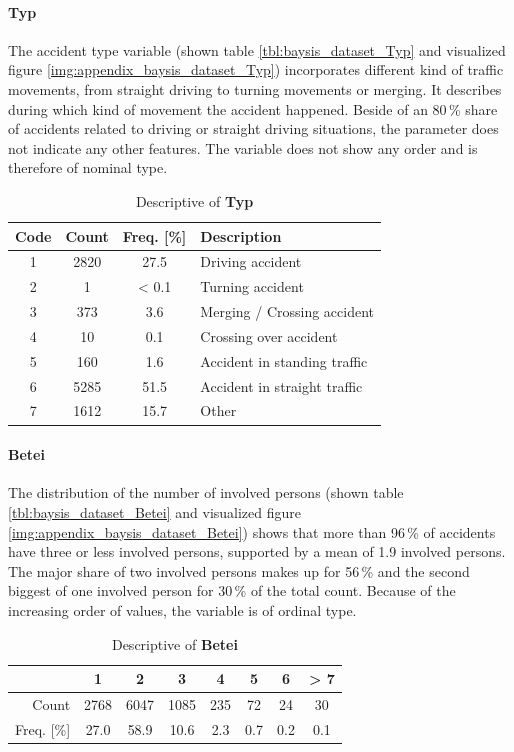 \paragraph{Typ}
The accident type variable (shown table \autoref{tbl:baysis_dataset_Typ} and visualized figure \autoref{img:appendix_baysis_dataset_Typ}) incorporates different kind of traffic movements, from straight driving to turning movements or merging. It describes during which kind of movement the accident happened. Beside of an 80\,\% share of accidents related to driving or straight driving situations, the parameter does not indicate any other features. The variable does not show any order and is therefore of nominal type.
\begin{table}[!ht]
	\centering
	\small
	\begin{tabular}{c|c|c|l} 
		\toprule
		Code & Count & Freq. [\%] & Description \\ 
		\midrule
 		1 & 2820	& 27.5	& Driving accident \\ 
 		2 & 1		& < 0.1 & Turning accident \\
 		3 & 373		& 3.6 	& Merging / Crossing accident \\
 		4 & 10		& 0.1	& Crossing over accident \\
 		5 & 160 	& 1.6	& Accident in standing traffic \\
 		6 & 5285	& 51.5	& Accident in straight traffic \\
		7 & 1612	& 15.7 	& Other \\
		\bottomrule
	\end{tabular}
	\caption{Descriptive of \textbf{Typ}}
	\label{tbl:baysis_dataset_Typ}
	\vspace{-8mm}
\end{table}

\paragraph{Betei}
The distribution of the number of involved persons (shown table \autoref{tbl:baysis_dataset_Betei} and visualized figure \autoref{img:appendix_baysis_dataset_Betei}) shows that more than 96\,\% of accidents have three or less involved persons, supported by a mean of 1.9 involved persons. The major share of two involved persons makes up for 56\,\% and the second biggest of one involved person for 30\,\% of the total count. Because of the increasing order of values, the variable is of ordinal type.
\begin{table}[!ht]
	\centering
	\small
	\begin{tabular}{r|ccccccc} 
		\toprule
		 			& 1		& 2		& 3		& 4		& 5		& 6  	& > 7\\ 
		\midrule
 		Count 		& 2768	& 6047	& 1085	& 235	& 72 	& 24	& 30 \\ 
 		Freq. [\%] 	& 27.0	& 58.9	& 10.6 	& 2.3	& 0.7 	& 0.2 	& 0.1 \\
		\bottomrule
	\end{tabular}
	\caption{Descriptive of \textbf{Betei}}
	\label{tbl:baysis_dataset_Betei}
	\vspace{-8mm}
\end{table}

